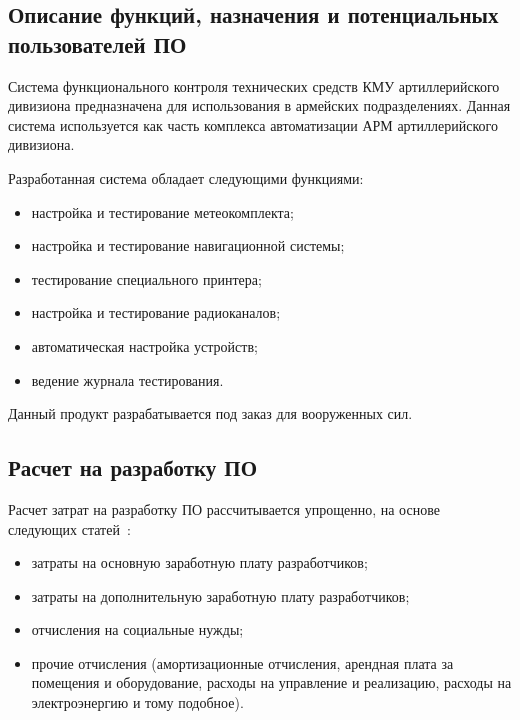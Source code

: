 


\FPeval{\cleanProfitDevExact}{\productPrice - \ndsExact - \totalExpensesExact}






\subsection{Описание функций, назначения и потенциальных пользователей ПО}

Система функционального контроля технических средств КМУ артиллерийского дивизиона предназначена для использования в
армейских подразделениях. Данная система используется как часть комплекса автоматизации АРМ артиллерийского дивизиона.

Разработанная система обладает следующими функциями:
\begin{itemize}
		\item настройка и тестирование метеокомплекта;
		\item настройка и тестирование навигационной системы;
		\item тестирование специального принтера;
		\item настройка и тестирование радиоканалов;
		\item автоматическая настройка устройств;
		\item ведение журнала тестирования.
\end{itemize}

Данный продукт разрабатывается под заказ для вооруженных сил.

\subsection{Расчет на разработку ПО}

Расчет затрат на разработку ПО рассчитывается упрощенно, на основе следующих статей~\cite{economics_diploma}:
\begin{itemize}
	\item затраты на основную заработную плату разработчиков;
	\item затраты на дополнительную заработную плату разработчиков;
	\item отчисления на социальные нужды;
	\item прочие отчисления (амортизационные отчисления, арендная плата за помещения и
		оборудование, расходы на управление и реализацию, расходы на электроэнергию и тому подобное).
\end{itemize}

